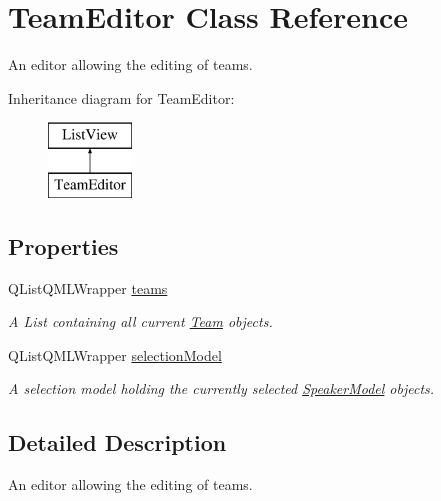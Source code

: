 \hypertarget{classTeamEditor}{\section{Team\-Editor Class Reference}
\label{classTeamEditor}
}


An editor allowing the editing of teams.  


Inheritance diagram for Team\-Editor\-:\begin{figure}[H]
\begin{center}
\leavevmode
\includegraphics[height=2.000000cm]{classTeamEditor}
\end{center}
\end{figure}
\subsection*{Properties}
\begin{DoxyCompactItemize}
\item 
\hypertarget{classTeamEditor_a215894d4698769bad1cfed7c4d05edfd}{Q\-List\-Q\-M\-L\-Wrapper \hyperlink{classTeamEditor_a215894d4698769bad1cfed7c4d05edfd}{teams}}\label{classTeamEditor_a215894d4698769bad1cfed7c4d05edfd}

\begin{DoxyCompactList}\small\item\em A List containing all current \hyperlink{classTeam}{Team} objects. \end{DoxyCompactList}\item 
\hypertarget{classTeamEditor_a82d28b574654b5d7e691c80cd11384fe}{Q\-List\-Q\-M\-L\-Wrapper \hyperlink{classTeamEditor_a82d28b574654b5d7e691c80cd11384fe}{selection\-Model}}\label{classTeamEditor_a82d28b574654b5d7e691c80cd11384fe}

\begin{DoxyCompactList}\small\item\em A selection model holding the currently selected \hyperlink{classSpeakerModel}{Speaker\-Model} objects. \end{DoxyCompactList}\end{DoxyCompactItemize}


\subsection{Detailed Description}
An editor allowing the editing of teams. 

